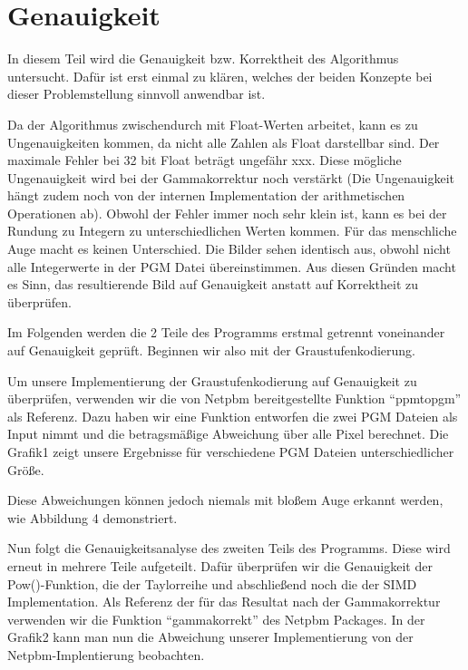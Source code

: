 \documentclass[course=erap]{aspdoc}
\begin{document}
\section{Genauigkeit}
\par
In diesem Teil wird die Genauigkeit bzw. Korrektheit des Algorithmus untersucht. Dafür ist erst einmal zu klären, welches der beiden Konzepte bei dieser Problemstellung sinnvoll anwendbar ist.

\par
Da der Algorithmus zwischendurch mit Float-Werten arbeitet, kann es zu Ungenauigkeiten kommen, da nicht alle Zahlen als Float darstellbar sind. Der maximale Fehler bei 32 bit Float beträgt ungefähr xxx. Diese mögliche Ungenauigkeit wird bei der Gammakorrektur noch verstärkt (Die Ungenauigkeit hängt zudem noch von der internen Implementation der arithmetischen Operationen ab). Obwohl der Fehler immer noch sehr klein ist, kann es bei der Rundung zu Integern zu unterschiedlichen Werten kommen. Für das menschliche Auge macht es keinen Unterschied. Die Bilder sehen identisch aus, obwohl nicht alle Integerwerte in der PGM Datei übereinstimmen. Aus diesen Gründen macht es Sinn, das resultierende Bild auf Genauigkeit anstatt auf Korrektheit zu überprüfen.

\par
Im Folgenden werden die 2 Teile des Programms erstmal getrennt voneinander auf Genauigkeit geprüft. Beginnen wir also mit der Graustufenkodierung.

\par
Um unsere Implementierung der Graustufenkodierung auf Genauigkeit zu überprüfen, verwenden wir die von Netpbm bereitgestellte Funktion “ppmtopgm” als Referenz. Dazu haben wir eine Funktion entworfen die zwei PGM Dateien als Input nimmt und die betragsmäßige Abweichung über alle Pixel berechnet. Die Grafik1 zeigt unsere Ergebnisse für verschiedene PGM Dateien unterschiedlicher Größe.

\par
Diese Abweichungen können jedoch niemals mit bloßem Auge erkannt werden, wie Abbildung 4 demonstriert.

\par
Nun folgt die Genauigkeitsanalyse des zweiten Teils des Programms. Diese wird erneut in mehrere Teile aufgeteilt. Dafür überprüfen wir die Genauigkeit der Pow()-Funktion, die der Taylorreihe und abschließend noch die der SIMD Implementation. Als Referenz der für das Resultat nach der Gammakorrektur verwenden wir die Funktion “gammakorrekt” des Netpbm Packages. In der Grafik2 kann man nun die Abweichung unserer Implementierung von der Netpbm-Implentierung beobachten.
\end{document}

